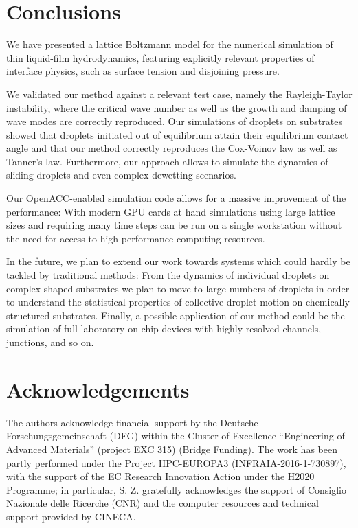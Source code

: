 \section{Conclusions}\label{sec:conclusions}
We have presented a lattice Boltzmann model for the numerical simulation of thin liquid-film hydrodynamics, featuring explicitly relevant properties of interface physics, such as surface tension and disjoining pressure.

We validated our method against a relevant test case, namely the Rayleigh-Taylor instability, where the critical wave number as well as the growth and damping of wave modes are correctly reproduced. 
Our simulations of droplets on substrates showed that droplets initiated out of equilibrium attain their equilibrium contact angle and that our method correctly reproduces the Cox-Voinov law as well as Tanner's law. 
Furthermore, our approach allows to simulate the dynamics of sliding droplets and even complex dewetting scenarios.

Our OpenACC-enabled simulation code allows for a massive improvement of the performance: With modern GPU cards at hand simulations using large lattice sizes and requiring many time steps can be run on a single workstation without the need for access to high-performance computing resources.

In the future, we plan to extend our work towards systems which could hardly be tackled by traditional methods: From the dynamics of individual droplets on complex shaped substrates we plan to move to large numbers of droplets in order to understand the statistical properties of collective droplet motion on chemically structured substrates. 
Finally, a possible application of our method could be the simulation of full laboratory-on-chip devices with highly resolved channels, junctions, and so on.
%

\section{Acknowledgements}\label{sec:ack}
The authors acknowledge financial support by the Deutsche Forschungsgemeinschaft (DFG) within the Cluster of Excellence ``Engineering of Advanced Materials'' (project EXC 315) (Bridge Funding). 
The work has been partly performed under the Project HPC-EUROPA3 (INFRAIA-2016-1-730897), with the support of the EC Research Innovation Action under the H2020 Programme; in particular, S. Z. gratefully acknowledges the support of Consiglio Nazionale delle Ricerche (CNR) and the computer resources and technical support provided by CINECA.

